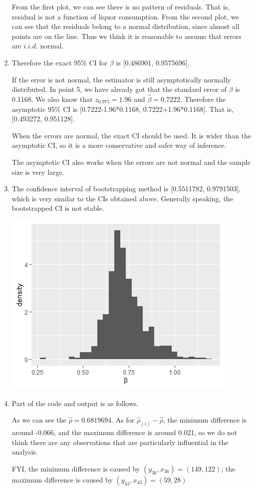 \documentclass[11pt]{article}
\begin{document}
\begin{enumerate}
From the first plot, we can see there is no pattern of residuals. That is, residual is not a function of liquor consumption. From the second plot, we can see that the residuals belong to a normal distribution, since almost all points are on the line. Thus we think it is reasonable to assume that errors are $i.i.d.$ normal.

\item

Therefore the exact 95\% CI  for $\beta$ is [0.486901, 0.9575696]. \par
\vspace{0.4cm}
If the error is not normal, the estimator is still asymptotically normally distributed. In point 5, we have already got that the standard error of $\beta$ is 0.1168. We also know that $z_{0.975}=1.96$ and $\hat{\beta}=0.7222$. Therefore the asymptotic 95\% CI is [0.7222-1.96*0.1168, 0.7222+1.96*0.1168]. That is, [0.493272, 0.951128].

When the errors are normal, the exact CI should be used. It is wider than the asymptotic CI, so it is a more conservative and safer way of inference. \par
The asymptotic CI also works when the errors are not normal and the sample size is very large. 


\item
The confidence interval of bootstrapping method is [0.5511782, 0.9791503], which is very similar to the CIs obtained above. Generally speaking, the bootstrapped CI is not stable.
\begin{center}
  \includegraphics[width=0.7\linewidth]{Q4_10.png}
\end{center}

\item
Part of the code and output is as follows. 


As we can see the $\hat{\rho}=0.6819694$. As for $\hat{\rho}_{(i)}-\hat{\rho}$, the minimum difference is around -0.066, and the maximum difference is around 0.021, so we do not think there are any observations that are particularly influential in the analysis. \par
FYI, the minimum difference is caused by $(y_{36},x_{36}) = (149, 122)$; the maximum difference is caused by $(y_{43},x_{43}) = (59,28)$

\end{enumerate}
\end{document}
